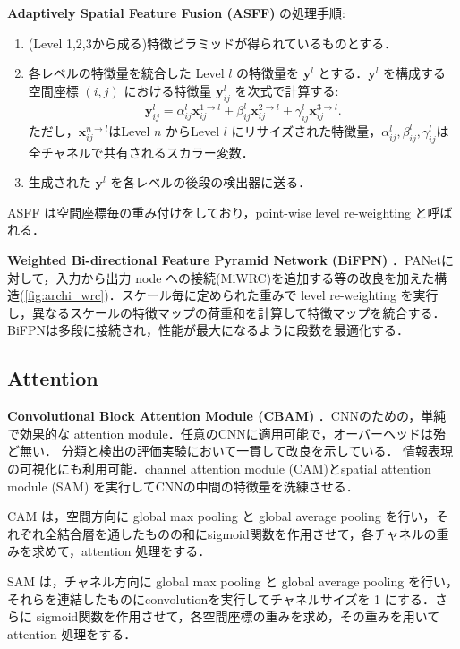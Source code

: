 \documentclass[originalpaper,fleqn]{jsaiart}     %
\newcommand{\vect}[1]{\boldsymbol #1}
\begin{document}
{\bf Adaptively Spatial Feature Fusion (ASFF)} \cite{LHW19}の処理手順:
\newcommand{\yb}[2]{\boldsymbol{y}^{#1}_{#2}}
\newcommand{\xb}[2]{\boldsymbol{x}^{#1}_{#2}}
\begin{enumerate}
    \item (Level 1,2,3から成る)特徴ピラミッドが得られているものとする．
    \item 各レベルの特徴量を統合した Level $l$ の特徴量を $\vect{y}^l$ とする．$\vect{y}^l$ を構成する空間座標 $(i,j)$ における特徴量 $\yb{l}{ij}$ を次式で計算する: $$ \yb{l}{ij} = \alpha^l_{ij}\xb{1{\rightarrow}l}{ij} + \beta^l_{ij}\xb{2{\rightarrow}l}{ij} + \gamma^l_{ij}\xb{3{\rightarrow}l}{ij}. $$ ただし，$\xb{n{\rightarrow}l}{ij}$はLevel $n$ からLevel $l$ にリサイズされた特徴量，$\alpha^l_{ij},\beta^l_{ij},\gamma^l_{ij}$は全チャネルで共有されるスカラー変数．
    \item 生成された $\vect{y}^l$ を各レベルの後段の検出器に送る．
\end{enumerate}
ASFF は空間座標毎の重み付けをしており，point-wise level re-weighting と呼ばれる．

{\bf Weighted Bi-directional Feature Pyramid Network (BiFPN)} \cite{TPL20}．PANetに対して，入力から出力 node への接続(MiWRC)を追加する等の改良を加えた構造(\ref{fig:archi_wrc})．スケール毎に定められた重みで level re-weighting を実行し，異なるスケールの特徴マップの荷重和を計算して特徴マップを統合する．BiFPNは多段に接続され，性能が最大になるように段数を最適化する．

\subsection{Attention}
{\bf Convolutional Block Attention Module (CBAM)} \cite{WPLK18}．CNNのための，単純で効果的な attention module．任意のCNNに適用可能で，オーバーヘッドは殆ど無い．
分類と検出の評価実験において一貫して改良を示している．
情報表現の可視化にも利用可能．channel attention module (CAM)とspatial attention module (SAM) を実行してCNNの中間の特徴量を洗練させる．

CAM は，空間方向に global max pooling と global average pooling を行い，それぞれ全結合層を通したものの和にsigmoid関数を作用させて，各チャネルの重みを求めて，attention 処理をする．

SAM は，チャネル方向に global max pooling と global average pooling を行い，それらを連結したものにconvolutionを実行してチャネルサイズを 1 にする．さらに sigmoid関数を作用させて，各空間座標の重みを求め，その重みを用いてattention 処理をする．
\end{document}
